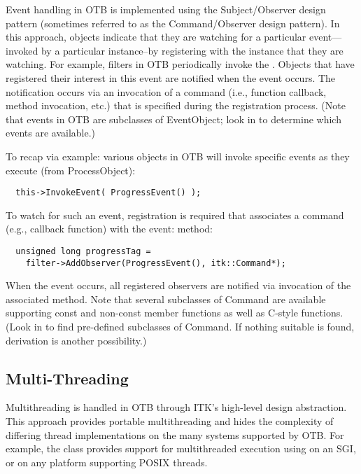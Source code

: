 
Event handling in OTB is implemented using the Subject/Observer design
pattern \cite{Gamma1995} (sometimes referred to as the Command/Observer
design pattern). In this approach, objects indicate that they are watching
for a particular event---invoked by a particular instance--by registering
with the instance that they are watching.  For example, filters in OTB
periodically invoke the . Objects that have registered
their interest in this event are notified when the event occurs. The
notification occurs via an invocation of a command (i.e., function callback,
method invocation, etc.) that is specified during the registration
process. (Note that events in OTB are subclasses of EventObject; look
in  to determine which events are available.)

To recap via example: various objects in OTB will invoke specific events
as they execute (from ProcessObject):
\small
\begin{verbatim}
  this->InvokeEvent( ProgressEvent() );
\end{verbatim}
\normalsize

To watch for such an event, registration is required that associates a
command (e.g., callback function) with the event:
 method:
\small
\begin{verbatim}
  unsigned long progressTag = 
    filter->AddObserver(ProgressEvent(), itk::Command*);
\end{verbatim}
\normalsize

When the event occurs, all registered observers are notified via invocation
of the associated  method. Note that several
subclasses of Command are available supporting const and
non-const member functions as well as C-style functions. (Look in
 to find pre-defined subclasses of
Command. If nothing suitable is found, derivation is another
possibility.)

\subsection{Multi-Threading}
\label{sec:MultiThreading}

Multithreading is handled in OTB through ITK's high-level design
abstraction. This approach provides portable multithreading and hides the
complexity of differing thread implementations on the many systems supported
by OTB. For example, the class  provides support for
multithreaded execution using  on an SGI, or
 on any platform supporting POSIX threads. 

